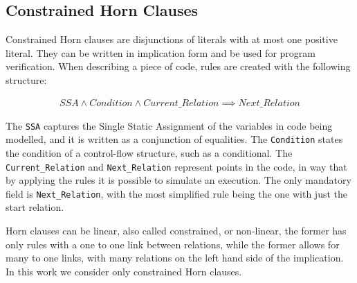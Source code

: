 
\subsection{Constrained Horn Clauses} \label{sec:background_chc}

Constrained Horn clauses are disjunctions of literals with at most one positive literal. They can be written in implication form and be used for program verification. When describing a piece of code, rules are created with the following structure:

\begin{align*}
SSA \land Condition \land Current\_Relation \implies Next\_Relation
\end{align*}

The \texttt{SSA} captures the Single Static Assignment of the variables in code being modelled, and it is written as a conjunction of equalities. The \texttt{Condition} states the condition of a control-flow structure, such as a conditional. The \texttt{Current\_Relation} and \texttt{Next\_Relation} represent points in the code, in way that by applying the rules it is possible to simulate an execution. The only mandatory field is \texttt{Next\_Relation}, with the most simplified rule being the one with just the start relation.

Horn clauses can be linear, also called constrained, or non-linear, the former has only rules with a one to one link between relations, while the former allows for many to one links, with many relations on the left hand side of the implication. In this work we consider only constrained Horn clauses.

%
